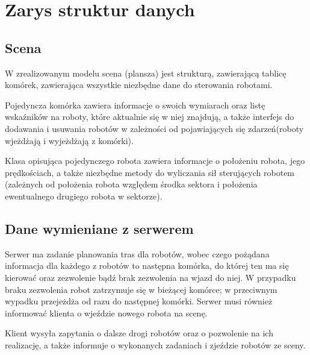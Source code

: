 
\section{Zarys struktur danych}

\subsection{Scena}

W zrealizowanym modelu scena (plansza) jest strukturą, zawierającą tablicę komórek, zawierająca wszystkie 
niezbędne dane do sterowania robotami.

Pojedyncza komórka zawiera informacje o swoich wymiarach oraz listę wskaźników na roboty, które aktualnie się w niej znajdują, a także interfejs do dodawania i usuwania robotów w zależności od pojawiających się zdarzeń(roboty wjeżdżają i wyjeżdżają z komórki).

Klasa opisująca pojedynczego robota zawiera informacje o położeniu robota, jego prędkościach, a także niezbędne metody do wyliczania sił sterujących robotem (zależnych od położenia robota względem środka sektora i położenia ewentualnego drugiego robota w sektorze).

\subsection{Dane wymieniane z serwerem}

Serwer ma zadanie planowania tras dla robotów, wobec czego pożądana informacja dla każdego z robotów to następna komórka, do której ten ma się kierować oraz zezwolenie bądź brak zezwolenia na wjazd do niej. W przypadku braku zezwolenia robot zatrzymuje się w bieżącej komórce; w przeciwnym wypadku przejeżdża od razu do następnej komórki. Serwer musi również informować klienta o wjeździe nowego robota na scenę.

Klient wysyła zapytania o dalsze drogi robotów oraz o pozwolenie na ich realizację, a także informuje o wykonanych zadaniach i zjeździe robotów ze sceny.
